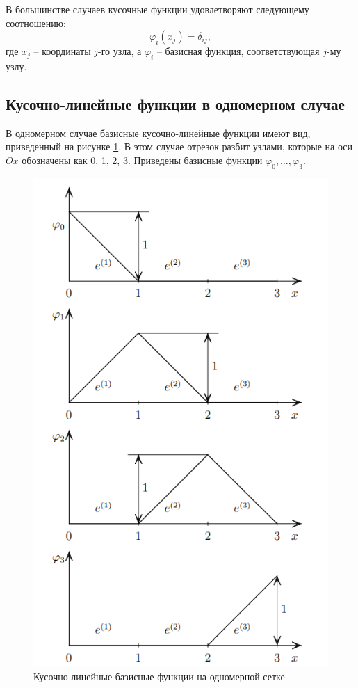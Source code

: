 \documentclass[a4paper, 11pt]{article}
\begin{document}
В большинстве случаев кусочные функции удовлетворяют следующему соотношению:
\begin{equation}
\varphi_i(x_j) = \delta_{ij},
\end{equation}
где $x_j$ -- координаты $j$-го узла, а $\varphi_i$ -- базисная функция, соответствующая $j$-му узлу.

\subsection{Кусочно-линейные функции в одномерном случае}
В одномерном случае базисные кусочно-линейные функции имеют вид, приведенный на рисунке \ref{pic:basis_1d}. В этом случае отрезок разбит узлами, которые на оси $Ox$ обозначены как 0, 1, 2, 3. Приведены базисные функции $\varphi_0, \dots, \varphi_3$.
\begin{figure}[h] \centering
	\includegraphics[scale=0.4]{basis_1d}
	\caption{Кусочно-линейные базисные функции на одномерной сетке\label{pic:basis_1d}}
\end{figure}
\end{document}
